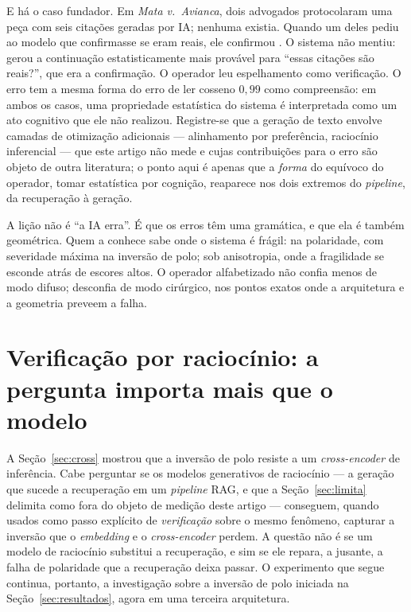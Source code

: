 \documentclass[11pt]{article}
\begin{document}
E há o caso fundador. Em \emph{Mata v.\ Avianca}, dois advogados protocolaram uma
peça com seis citações geradas por IA; nenhuma existia. Quando um deles pediu ao
modelo que confirmasse se eram reais, ele confirmou \cite{mata2023}. O sistema não
mentiu: gerou a continuação estatisticamente mais provável para ``essas citações
são reais?'', que era a confirmação. O operador leu espelhamento como verificação.
O erro tem a mesma forma do erro de ler cosseno $0{,}99$ como compreensão: em ambos
os casos, uma propriedade estatística do sistema é interpretada como um ato
cognitivo que ele não realizou. Registre-se que a geração de texto envolve camadas
de otimização adicionais --- alinhamento por preferência, raciocínio inferencial ---
que este artigo não mede e cujas contribuições para o erro são objeto de outra
literatura; o ponto aqui é apenas que a \emph{forma} do equívoco do operador, tomar
estatística por cognição, reaparece nos dois extremos do \textit{pipeline}, da
recuperação à geração.

A lição não é ``a IA erra''. É que os erros têm uma gramática, e que ela é também
geométrica. Quem a conhece sabe onde o sistema é frágil: na polaridade, com
severidade máxima na inversão de polo; sob anisotropia, onde a fragilidade se
esconde atrás de escores altos. O operador alfabetizado não confia menos de modo
difuso; desconfia de modo cirúrgico, nos pontos exatos onde a arquitetura e a
geometria preveem a falha.

\section{Verificação por raciocínio: a pergunta importa mais que o modelo}
\label{sec:reasoning}

A Seção~\ref{sec:cross} mostrou que a inversão de polo resiste a um
\textit{cross-encoder} de inferência. Cabe perguntar se os modelos generativos de
raciocínio --- a geração que sucede a recuperação em um \textit{pipeline} RAG, e
que a Seção~\ref{sec:limita} delimita como fora do objeto de medição deste artigo
--- conseguem, quando usados como passo explícito de \emph{verificação} sobre o
mesmo fenômeno, capturar a inversão que o \textit{embedding} e o
\textit{cross-encoder} perdem. A questão não é se um modelo de raciocínio
substitui a recuperação, e sim se ele repara, a jusante, a falha de polaridade que
a recuperação deixa passar. O experimento que segue continua, portanto, a
investigação sobre a inversão de polo iniciada na Seção~\ref{sec:resultados}, agora
em uma terceira arquitetura.
\end{document}

